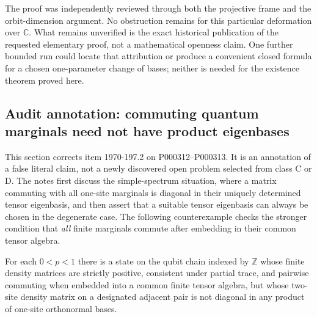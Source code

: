 The proof was independently reviewed through both the projective
frame and the orbit-dimension argument. No obstruction remains
for this particular deformation over $\mathbb C$. What remains
unverified is the exact historical publication of the requested
elementary proof, not a mathematical openness claim. One further
bounded run could locate that attribution or produce a convenient
closed formula for a chosen one-parameter change of bases;
neither is needed for the existence theorem proved here.

\subsection{Audit annotation: commuting quantum marginals need not have product eigenbases}
\label{dev:bell}

This section corrects item 1970-197.2 on P000312--P000313. It is an
annotation of a false literal claim, not a newly discovered open
problem selected from class C or D. The notes first discuss the
simple-spectrum situation, where a matrix commuting with all
one-site marginals is diagonal in their uniquely determined tensor
eigenbasis, and then assert that a suitable tensor eigenbasis can
always be chosen in the degenerate case. The following counterexample
checks the stronger condition that \emph{all} finite marginals
commute after embedding in their common tensor algebra.

\begin{proposition}\ours{}
For each $0<p<1$ there is a state on the qubit chain indexed by
$\mathbb Z$ whose finite density matrices are strictly positive,
consistent under partial trace, and pairwise commuting when
embedded into a common finite tensor algebra, but whose two-site
density matrix on a designated adjacent pair is not diagonal in
any product of one-site orthonormal bases.
\end{proposition}


